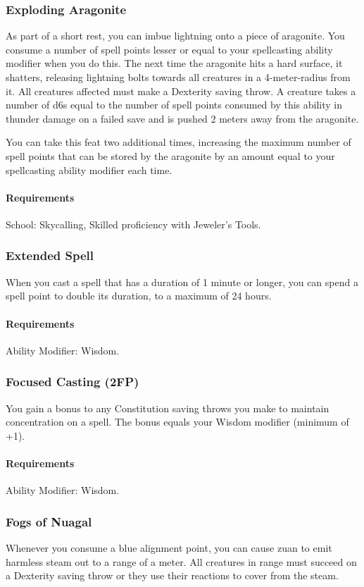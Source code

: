 \subsubsection{Exploding Aragonite} \label{feat::explodingaragonite}
    As part of a short rest, you can imbue lightning onto a piece of aragonite.
    You consume a number of spell points lesser or equal to your spellcasting ability modifier when you do this.
    The next time the aragonite hits a hard surface, it shatters, releasing lightning bolts towards all creatures in a 4-meter-radius from it.
    All creatures affected must make a Dexterity saving throw.
    A creature takes a number of d6s equal to the number of spell points consumed by this ability in thunder damage on a failed save and is pushed 2 meters away from the aragonite.

    You can take this feat two additional times, increasing the maximum number of spell points that can be stored by the aragonite by an amount equal to your spellcasting ability modifier each time.
    \paragraph{Requirements} School: Skycalling, Skilled proficiency with Jeweler's Tools.
\subsubsection{Extended Spell} \label{feat::extendedspell}
    When you cast a spell that has a duration of 1 minute or longer, you can spend a spell point to double its duration, to a maximum of 24 hours.
    \paragraph{Requirements} Ability Modifier: Wisdom.
\subsubsection{Focused Casting (2FP)} \label{feat::focusedcasting}
    You gain a bonus to any Constitution saving throws you make to maintain concentration on a spell.
    The bonus equals your Wisdom modifier (minimum of +1).
    \paragraph{Requirements} Ability Modifier: Wisdom.
\subsubsection{Fogs of Nuagal} \label{feat::fogsofnuagal}
    Whenever you consume a blue alignment point, you can cause zuan to emit harmless steam out to a range of a meter.
    All creatures in range must succeed on a Dexterity saving throw or they use their reactions to cover from the steam.
